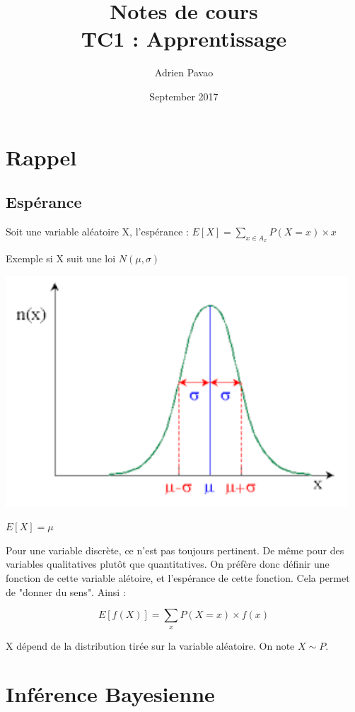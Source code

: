 \documentclass{article}
\title{Notes de cours\\TC1 : Apprentissage}
\author{Adrien Pavao}
\date{September 2017}
\begin{document}
\maketitle

\tableofcontents

\section{Rappel}

\subsection{Espérance}

Soit une variable aléatoire X, l'espérance : $E[X] = \sum_{x \in A_x} P(X = x) \times x$

Exemple si X suit une loi $N(\mu, \sigma)$ 

\includegraphics[scale=0.4]{loinormale.png}

$E[X] = \mu$

Pour une variable discrète, ce n'est pas toujours pertinent. De même pour des variables qualitatives plutôt que quantitatives. On préfère donc définir une fonction de cette variable alétoire, et l'espérance de cette fonction. Cela permet de "donner du sens". Ainsi :

\[ E[f(X)] = \sum_x P(X = x) \times f(x) \]

X dépend de la distribution tirée sur la variable aléatoire. On note $X \sim P$.

\section{Inférence Bayesienne}
\end{document}
